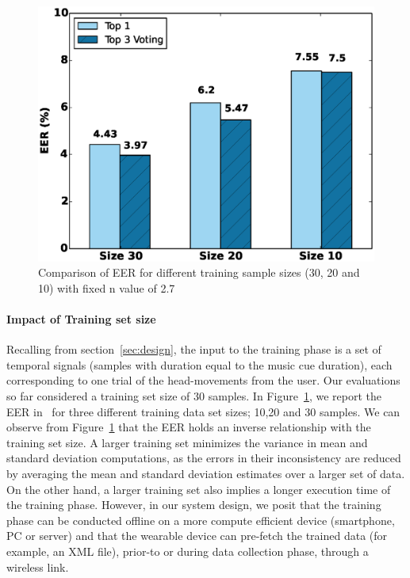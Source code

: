 \begin{figure}[t]
\centering
\includegraphics [width=\columnwidth]{figure/exp2_vary_size.eps}
\caption{Comparison of EER for different training sample sizes (30, 20 and 10) 
with fixed n value of 2.7}
\label{fig:eer-size}
\end{figure}


\paragraph{Impact of Training set size}
Recalling from \systemname section~\ref{sec:design}, the input to the training phase
is a set of temporal signals (samples with duration equal to the music cue 
duration), each corresponding to one trial of the head-movements from the 
user. Our evaluations so far considered a training set size of 30 samples. 
In Figure~\ref{fig:eer-size}, we report the EER in \systemname~for three 
different training data set sizes; 10,20 and 30 samples.
We can observe from Figure~\ref{fig:eer-size} that the EER holds an inverse 
relationship with the training set size. A larger training set minimizes the 
variance in mean and standard deviation computations, as the errors in their 
inconsistency are reduced by averaging the mean and standard deviation 
estimates over a larger set of data. 
On the other hand, a larger training set also implies a longer execution time 
of the training phase.
However, in our system design, we posit that the training phase can be 
conducted 
offline on a more compute efficient device (smartphone, PC or server) and that 
the wearable device can pre-fetch the trained data (for example, an XML file), 
prior-to or during data collection phase, through a wireless link.


